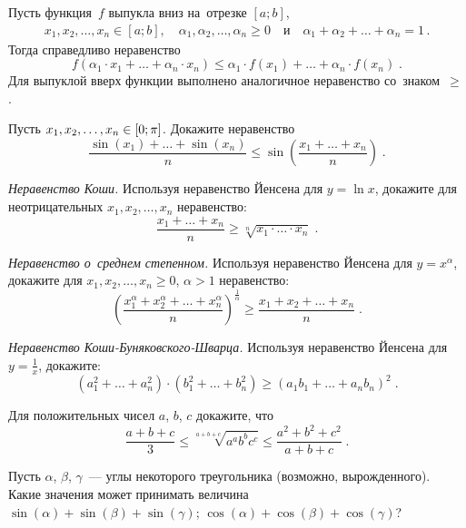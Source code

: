 \begin{problems}

\item{}
Пусть функция~$f$ выпукла вниз на~отрезке $[a;b]$,
\begin{gather*}
    x_1, x_2, \ldots, x_n \in [a; b]
,\quad
    \alpha_1, \alpha_2, \ldots, \alpha_n \geq 0
\quad\text{и}\quad
    \alpha_1 + \alpha_2 + \ldots + \alpha_n = 1
\, . \end{gather*}
Тогда справедливо неравенство
\[
    f(\alpha_1 \cdot x_1 + \ldots + \alpha_n \cdot x_n)
\leq
    \alpha_1 \cdot f(x_1) + \ldots + \alpha_n \cdot f(x_n)
\; . \]
Для выпуклой вверх функции выполнено аналогичное неравенство со~знаком~$\geq$.

\item
Пусть $x_1, x_2, \ldots, x_n \in [0; \mathrm{\pi}]$.
Докажите неравенство
\[
    \frac{\sin(x_1) + \ldots + \sin(x_n)}{n}
\leq
    \sin\left(
        \frac{x_1 + \ldots + x_n}{n}
    \right)
\; . \]

\item\emph{Неравенство Коши.}
Используя неравенство Йенсена для $y = \ln x$, докажите для неотрицательных
$x_1, x_2, \ldots, x_n$ неравенство:
\[
    \frac{x_1 + \ldots + x_n}{n}
\geq
    \sqrt[n]{x_1 \cdot \ldots \cdot x_n}
\; . \]

\item\emph{Неравенство о~среднем степенном.}
Используя неравенство Йенсена для $y = x^{\alpha}$, докажите для
$x_1, x_2, \ldots, x_n \geq 0$, $\alpha > 1$ неравенство:
\[
    \left(
        \frac{
            x_1^{\alpha} + x_2^{\alpha} + \ldots + x_n^{\alpha}
        }{n}
    \right)^{\frac{1}{\alpha}}
\geq
    \frac{x_1 + x_2 + \ldots + x_n}{n}
\; . \]

\item\emph{Неравенство Коши-Буняковского-Шварца.}
Используя неравенство Йенсена для $y = \frac{1}{x}$, докажите:
\[
    (a_1^2 + \ldots + a_n^2) \cdot (b_1^2 + \ldots + b_n^2)
\geq
    (a_1 b_1 + \ldots + a_n b_n)^2
\; . \]

\item
Для положительных чисел $a$, $b$, $c$ докажите, что
\[
    \frac{a + b + c}{3}
\leq
    \sqrt[a+b+c]{a^a b^b c^c}
\leq
    \frac{a^2 + b^2 + c^2}{a + b + c}
\; . \]

\item
Пусть $\alpha$, $\beta$, $\gamma$~--- углы некоторого треугольника
(возможно, вырожденного).
Какие значения может принимать величина
\\
\subproblem $\sin(\alpha) + \sin(\beta) + \sin(\gamma)$;
\quad
\subproblem $\cos(\alpha) + \cos(\beta) + \cos(\gamma)$?


\end{problems}
